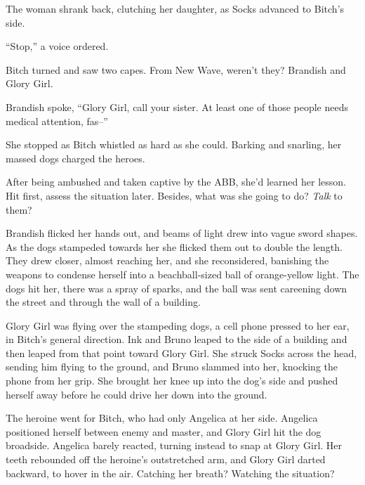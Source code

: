 The woman shrank back, clutching her daughter, as Socks advanced to Bitch's side.



``Stop,'' a voice ordered.



Bitch turned and saw two capes.  From New Wave, weren't they?  Brandish and Glory Girl.



Brandish spoke, ``Glory Girl, call your sister.  At least one of those people needs medical attention, fas--''



She stopped as Bitch whistled as hard as she could.  Barking and snarling, her massed dogs charged the heroes.



After being ambushed and taken captive by the ABB, she'd learned her lesson.  Hit first, assess the situation later.  Besides, what was she going to do?  \emph{Talk} to them?



Brandish flicked her hands out, and beams of light drew into vague sword shapes.  As the dogs stampeded towards her she flicked them out to double the length.  They drew closer, almost reaching her, and she reconsidered, banishing the weapons to condense herself into a beachball-sized ball of orange-yellow light. The dogs hit her, there was a spray of sparks, and the ball was sent careening down the street and through the wall of a building.



Glory Girl was flying over the stampeding dogs, a cell phone pressed to her ear, in Bitch's general direction.  Ink and Bruno leaped to the side of a building and then leaped from that point toward Glory Girl.  She struck Socks across the head, sending him flying to the ground, and Bruno slammed into her, knocking the phone from her grip.  She brought her knee up into the dog's side and pushed herself away before he could drive her down into the ground.



The heroine went for Bitch, who had only Angelica at her side.  Angelica positioned herself between enemy and master, and Glory Girl hit the dog broadside.  Angelica barely reacted, turning instead to snap at Glory Girl.  Her teeth rebounded off the heroine's outstretched arm, and Glory Girl darted backward, to hover in the air.  Catching her breath?  Watching the situation?



